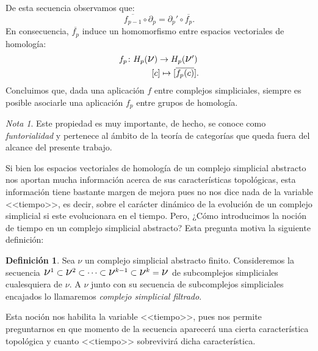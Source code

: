 \documentclass[12pt, a4paper, twoside]{book}
\numberwithin{equation}{section}
\theoremstyle{definition}
\newtheorem{defi}{Definición}[section]
\theoremstyle{remark}
\newtheorem*{remark}{Nota}
\theoremstyle{plain}
\begin{document}
	De esta secuencia observamos que: 
	\begin{equation*}
		\overline{f_{p-1}}\circ\partial_{p}=
		\partial_{p}'\circ\overline{f_{p}}. 
	\end{equation*}
	En consecuencia, $\overline{f_{p}}$ induce un 
	homomorfismo entre espacios vectoriales de homología:	
		\begin{align*}
			\left.
			\begin{array}{l}
				f_{p}\colon H_{p}(\text{{\Large $\nu$}})
				\rightarrow 
				H_{p}(\text{{\Large $\nu$}}')\\[3pt] 
				\hspace{1.35cm} [c] \mapsto [\overline{f_{p}
				(c)}].
			\end{array}
			\right.
		\end{align*}
	Concluimos que, dada una aplicación $f$ entre complejos simpliciales, 
	siempre es posible asociarle una aplicación $f_{p}$ entre grupos de 
	homología.
	
	\begin{remark}
		Este propiedad es muy importante, de hecho, se conoce como 
		\emph{funtorialidad} y pertenece al ámbito de la teoría de 
		categorías que queda fuera del alcance del presente trabajo. 
	\end{remark}

	Si bien los espacios vectoriales de homología de un complejo 
	simplicial abstracto nos aportan mucha información acerca de sus 
	características topológicas, esta información tiene bastante margen de 
	mejora pues no nos dice nada de la variable <<tiempo>>, es decir, 
	sobre el carácter dinámico de la evolución de un complejo simplicial 
	si este evolucionara en el tiempo. Pero, ¿Cómo 
	introducimos la noción de tiempo en un complejo simplicial abstracto? 
	Esta pregunta motiva la siguiente definición:

	\begin{defi}
		Sea {\Large $\nu$} un complejo simplicial abstracto finito. 
		Consideremos la secuencia $ \text{{\Large $\nu$}$^{1}$} 
		\subset \text{{\Large $\nu$}$^{2}$} \subset \cdots \subset
		\text{{\Large $\nu$}$^{k-1}$} \subset 
		\text{{\Large $\nu$}$^{k}$} = \text{{\Large $\nu$}}$ de 
		subcomplejos simpliciales cualesquiera de {\Large $\nu$}. A
		{\Large $\nu$} junto con su secuencia de subcomplejos 
		simpliciales encajados lo llamaremos \textit{complejo 
		simplicial filtrado}. 
	\end{defi}

	Esta noción nos habilita la variable <<tiempo>>, pues nos permite 
	preguntarnos en que momento de la secuencia aparecerá una cierta 
	característica topológica y cuanto <<tiempo>> sobrevivirá dicha 
	característica.
\end{document}
